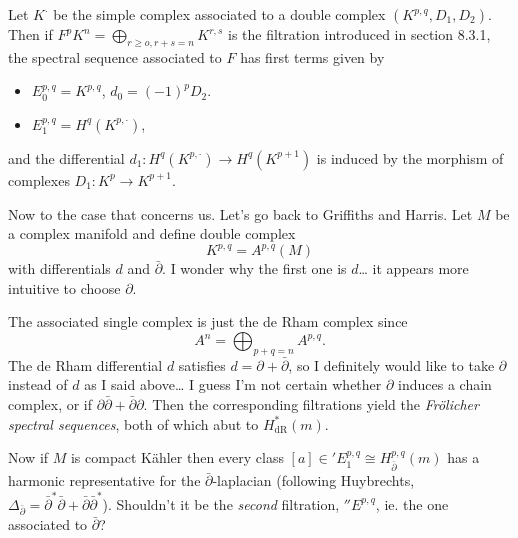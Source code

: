 \begin{proposition}[Voisin, 8.25]
\label{proposition-voisin-8-25}
	Let $K^\cdot$ be the simple complex
	associated to a double complex
	$(K^{p,q},D_1,D_2)$. Then if
	$F^pK^n=\bigoplus_{r\geq o,r+s=n} K^{r,s}$
	is the filtration introduced in section
	8.3.1, the spectral sequence associated to
	$F$ has first terms given by
	\begin{itemize}
		\item $E^{p,q}_0=K^{p,q}$, $d_0=(-1)^pD_2$.
		\item $E^{p,q}_1=H^{q}(K^{p,\cdot})$,
	\end{itemize}
	and the differential $d_1:H^{q}(K^{p,\cdot
	})\to H^{q}(K^{p+1})$ is induced by the
	morphism of complexes $D_1:K^p\to K^{p+1}$.

\end{proposition}

Now to the case that concerns us. Let's go
back to Griffiths and Harris. Let $M$ be a
complex manifold and define double complex
$$K^{p,q}=A^{p,q}(M)$$
with differentials $d$ and $\bar\partial$. I
wonder why the first one is $ d$… it appears
more intuitive to choose $\partial$.

The associated single complex is just the de
Rham complex since
$$A^{n}=\bigoplus_{p+q=n} A^{p,q}.$$
The de Rham differential $d$ satisfies
$d=\partial+\bar\partial$, so I definitely
would like to take $\partial$ instead of $d$
as I said above… I guess I'm not certain
whether $\partial$ induces a chain complex, or
if
$\partial\bar\partial+\bar\partial\partial$.
Then the corresponding filtrations yield the
{\it Fr\"olicher spectral sequences}, both of
which abut to $H^{*}_{\text{dR}}(m)$.

Now if $M$ is compact K\"ahler then every
class $[a]\in 'E^{p,q}_1\cong
H^{p,q}_{\bar\partial}(m)$ has a harmonic
representative for the
$\bar\partial$-laplacian (following
Huybrechts,
$\Delta_{\bar\partial}=
\bar\partial^*\bar\partial+
\bar\partial\bar\partial^*$).
Shouldn't it be the \textit{second}
filtration, $''E^{p,q}$, ie. the one
associated to $\bar\partial$?

